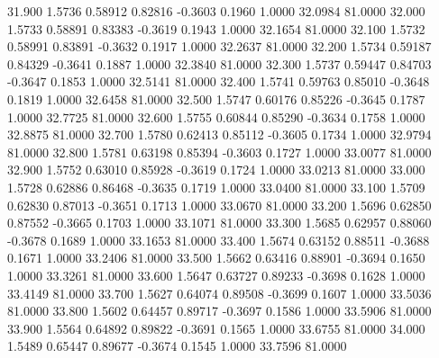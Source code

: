   31.900   1.5736   0.58912   0.82816  -0.3603   0.1960   1.0000  32.0984  81.0000
  32.000   1.5733   0.58891   0.83383  -0.3619   0.1943   1.0000  32.1654  81.0000
  32.100   1.5732   0.58991   0.83891  -0.3632   0.1917   1.0000  32.2637  81.0000
  32.200   1.5734   0.59187   0.84329  -0.3641   0.1887   1.0000  32.3840  81.0000
  32.300   1.5737   0.59447   0.84703  -0.3647   0.1853   1.0000  32.5141  81.0000
  32.400   1.5741   0.59763   0.85010  -0.3648   0.1819   1.0000  32.6458  81.0000
  32.500   1.5747   0.60176   0.85226  -0.3645   0.1787   1.0000  32.7725  81.0000
  32.600   1.5755   0.60844   0.85290  -0.3634   0.1758   1.0000  32.8875  81.0000
  32.700   1.5780   0.62413   0.85112  -0.3605   0.1734   1.0000  32.9794  81.0000
  32.800   1.5781   0.63198   0.85394  -0.3603   0.1727   1.0000  33.0077  81.0000
  32.900   1.5752   0.63010   0.85928  -0.3619   0.1724   1.0000  33.0213  81.0000
  33.000   1.5728   0.62886   0.86468  -0.3635   0.1719   1.0000  33.0400  81.0000
  33.100   1.5709   0.62830   0.87013  -0.3651   0.1713   1.0000  33.0670  81.0000
  33.200   1.5696   0.62850   0.87552  -0.3665   0.1703   1.0000  33.1071  81.0000
  33.300   1.5685   0.62957   0.88060  -0.3678   0.1689   1.0000  33.1653  81.0000
  33.400   1.5674   0.63152   0.88511  -0.3688   0.1671   1.0000  33.2406  81.0000
  33.500   1.5662   0.63416   0.88901  -0.3694   0.1650   1.0000  33.3261  81.0000
  33.600   1.5647   0.63727   0.89233  -0.3698   0.1628   1.0000  33.4149  81.0000
  33.700   1.5627   0.64074   0.89508  -0.3699   0.1607   1.0000  33.5036  81.0000
  33.800   1.5602   0.64457   0.89717  -0.3697   0.1586   1.0000  33.5906  81.0000
  33.900   1.5564   0.64892   0.89822  -0.3691   0.1565   1.0000  33.6755  81.0000
  34.000   1.5489   0.65447   0.89677  -0.3674   0.1545   1.0000  33.7596  81.0000
